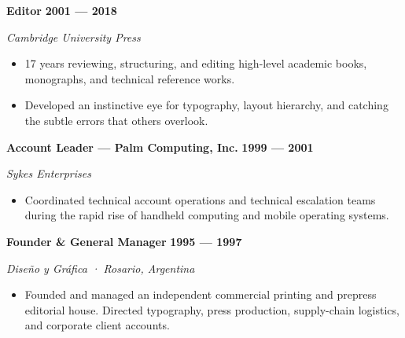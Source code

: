 \documentclass[a4paper]{article}
\begin{document}
\vspace{2pt}
\noindent
\textbf{\fontsize{8.7}{10.5}\selectfont Editor} \hfill \textbf{\fontsize{7.8}{9}\selectfont\color{accent} 2001 — 2018}\par
\vspace{1pt}
\noindent\textit{\fontsize{7.8}{9}\selectfont Cambridge University Press}\par
\vspace{-2pt}
\begin{itemize}
  \item 17 years reviewing, structuring, and editing high-level academic books, monographs, and technical reference works.
  \item Developed an instinctive eye for typography, layout hierarchy, and catching the subtle errors that others overlook.
\end{itemize}

\vspace{2pt}
\noindent
\textbf{\fontsize{8.7}{10.5}\selectfont Account Leader — Palm Computing, Inc.} \hfill \textbf{\fontsize{7.8}{9}\selectfont\color{accent} 1999 — 2001}\par
\vspace{1pt}
\noindent\textit{\fontsize{7.8}{9}\selectfont Sykes Enterprises}\par
\vspace{-2pt}
\begin{itemize}
  \item Coordinated technical account operations and technical escalation teams during the rapid rise of handheld computing and mobile operating systems.
\end{itemize}

\vspace{2pt}
\noindent
\textbf{\fontsize{8.7}{10.5}\selectfont Founder \& General Manager} \hfill \textbf{\fontsize{7.8}{9}\selectfont\color{accent} 1995 — 1997}\par
\vspace{1pt}
\noindent\textit{\fontsize{7.8}{9}\selectfont Diseño y Gráfica · Rosario, Argentina}\par
\vspace{-2pt}
\begin{itemize}
  \item Founded and managed an independent commercial printing and prepress editorial house. Directed typography, press production, supply-chain logistics, and corporate client accounts.
\end{itemize}
\end{document}
